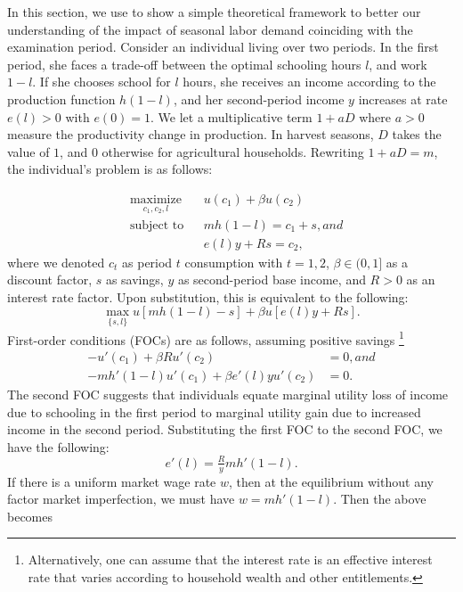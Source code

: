 \documentclass[12pt,letterpaper]{article}
\newcommand{\0}{\ensuremath{\mbox{\boldmath $0$}}}
\begin{document}
In this section, we use \cite{BalandRobinson2000} to show a simple theoretical framework to better our understanding of the impact of seasonal labor demand coinciding with the examination period. Consider an individual living over two periods. In the first period, she faces a trade-off between the optimal schooling hours $l$, and work $1-l$. If she chooses school for $l$ hours, she receives an income according to the production function $h(1-l)$, and her second-period income $y$ increases at rate $e(l)>0$ with $e(0) = 1$. We let a multiplicative term $1+aD$ where $a>0$ measure the productivity change in production. In harvest seasons, $D$ takes the value of $1$, and $0$ otherwise for agricultural households. Rewriting $1+aD = m$, the individual's problem is as follows:

\begin{equation}
\begin{aligned}
& \underset{c_{1}, c_{2}, l}{\text{maximize}}
& &  u(c_{1}) + \beta u(c_{2}) \\
& \text{subject to}
& & mh(1-l)=c_{1}+s, and \\
& & & e(l)y+Rs= c_{2},
\end{aligned}
\label{umax}
\end{equation}
where we denoted $c_{t}$ as period $t$ consumption with $t=1,2$, $\beta\in(0, 1]$ as a discount factor, $s$ as savings, $y$ as second-period base income, and $R>0$ as an interest rate factor. Upon substitution, this is equivalent to the following:
\[
\max_{\{s, l\}} u[mh(1-l) - s] + \beta u[e(l)y+Rs].
\]
First-order conditions (FOCs) are as follows, assuming positive savings \footnote{Alternatively, one can assume that the interest rate is an effective interest rate that varies according to household wealth and other entitlements.}
\[
\begin{aligned}
-u'(c_{1})+\beta R u'(c_{2}) &= 0, and \\
-mh'(1-l)u'(c_{1})+\beta e'(l)y u'(c_{2}) &= 0.
\end{aligned}
\]
The second FOC suggests that individuals equate marginal utility loss of income due to schooling in the first period to marginal utility gain due to increased income in the second period. Substituting the first FOC to the second FOC, we have the following:
\begin{equation}
e'(l)  = \tfrac{R}{y}mh'(1-l).
\label{l}
\end{equation}
If there is a uniform market wage rate $w$, then at the equilibrium without any factor market imperfection, we must have $w=mh'(1-l)$. Then the above becomes
\end{document}
